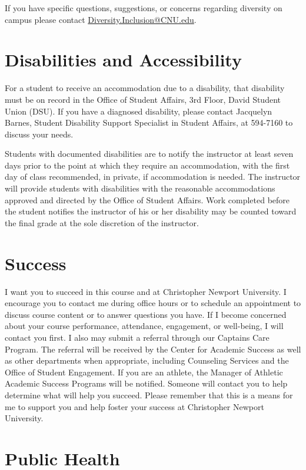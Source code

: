 \documentclass[11pt]{article}
\begin{document}
If you have specific questions, suggestions, or concerns regarding diversity on campus please contact \href{mailto:Diversity.Inclusion@CNU.edu}{Diversity.Inclusion@CNU.edu}.

\section{Disabilities and Accessibility}

For a student to receive an accommodation due to a disability, that disability must be on record in the Office of Student Affairs, 3rd Floor, David Student Union (DSU). If you have a diagnosed disability, please contact Jacquelyn Barnes, Student Disability Support Specialist in Student Affairs, at 594-7160 to discuss your needs.

Students with documented disabilities are to notify the instructor at least seven days prior to the point at which they require an accommodation, with the first day of class recommended, in private, if accommodation is needed. The instructor will provide students with disabilities with the reasonable accommodations approved and directed by the Office of Student Affairs. Work completed before the student notifies the instructor of his or her disability may be counted toward the final grade at the sole discretion of the instructor.

\section{Success}

I want you to succeed in this course and at Christopher Newport University. I encourage you to contact me during office hours or to schedule an appointment to discuss course content or to answer questions you have. If I become concerned about your course performance, attendance, engagement, or well-being, I will contact you first. I also may submit a referral through our Captains Care Program. The referral will be received by the Center for Academic Success as well as other departments when appropriate, including Counseling Services and the Office of Student Engagement. If you are an athlete, the Manager of Athletic Academic Success Programs will be notified. Someone will contact you to help determine what will help you succeed. Please remember that this is a means for me to support you and help foster your success at Christopher Newport University.

\section{Public Health}
\end{document}
